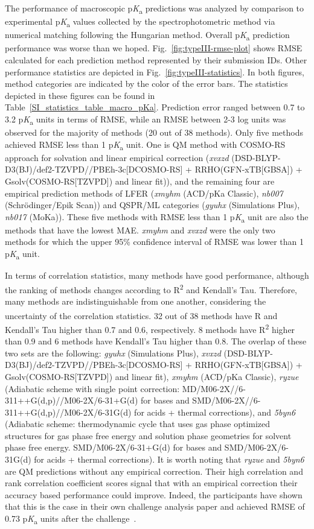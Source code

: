 \documentclass[9pt,lineno,final]{elife}
\newcommand{\pKa}{p\textit{K}\textsubscript{a}}
\begin{document}
The performance of macroscopic \pKa{} predictions was analyzed by comparison to experimental \pKa{} values collected by the spectrophotometric method via numerical matching following the Hungarian method.  
Overall \pKa{} prediction performance was worse than we hoped. 
Fig.~\ref{fig:typeIII-rmse-plot} shows RMSE calculated for each prediction method represented by their submission IDs. 
Other performance statistics are depicted in Fig.~\ref{fig:typeIII-statistics}.
In both figures, method categories are indicated by the color of the error bars. The statistics depicted in these figures can be found in Table~\ref{SI_statistics_table_macro_pKa}.
Prediction error ranged between 0.7 to 3.2 \pKa{} units in terms of RMSE, while an RMSE between 2-3 log units was observed for the majority of methods (20 out of 38 methods). 
Only five methods achieved RMSE less than 1 \pKa{} unit. 
One is QM method with COSMO-RS approach for solvation and linear empirical correction (\textit{xvxzd} (DSD-BLYP-D3(BJ)/def2-TZVPD//PBEh-3c[DCOSMO-RS] + RRHO(GFN-xTB[GBSA]) + Gsolv(COSMO-RS[TZVPD]) and linear fit)), and the remaining four are empirical prediction methods of LFER (\textit{xmyhm} (ACD/pKa Classic), \textit{nb007} (Schr\"{o}dinger/Epik Scan)) and QSPR/ML categories (\textit{gyuhx} (Simulations Plus), \textit{nb017} (MoKa)). 
These five methods with RMSE less than 1 \pKa{} unit are also the methods that have the lowest MAE.
\textit{xmyhm} and \textit{xvxzd} were the only two methods for which the upper 95\% confidence interval of RMSE was lower than 1 \pKa{} unit. 

In terms of correlation statistics, many methods have good performance, although the ranking of methods changes according to R\textsuperscript{2} and Kendall's Tau. 
Therefore, many methods are indistinguishable from one another, considering the uncertainty of the correlation statistics. 
32 out of 38 methods have R\textsuperscript{} and Kendall's Tau higher than 0.7 and 0.6, respectively.
8 methods have R\textsuperscript{2} higher than 0.9 and 6 methods have Kendall's Tau higher than 0.8.
The overlap of these two sets are the following:
\textit{gyuhx} (Simulations Plus), \textit{xvxzd} (DSD-BLYP-D3(BJ)/def2-TZVPD//PBEh-3c[DCOSMO-RS] + RRHO(GFN-xTB[GBSA]) + Gsolv(COSMO-RS[TZVPD]) and linear fit), \textit{xmyhm} (ACD/pKa Classic), \textit{ryzue} (Adiabatic scheme with single point correction: MD/M06-2X//6-311++G(d,p)//M06-2X/6-31+G(d) for bases and SMD/M06-2X//6-311++G(d,p)//M06-2X/6-31G(d) for acids + thermal corrections), and \textit{5byn6} 
(Adiabatic scheme: thermodynamic cycle that uses gas phase optimized structures for gas phase free energy and solution phase geometries for solvent phase free energy. 
SMD/M06-2X/6-31+G(d) for bases and SMD/M06-2X/6-31G(d) for acids + thermal corrections).
It is worth noting that \textit{ryzue} and \textit{5byn6} are QM predictions without any empirical correction. Their high correlation and rank correlation coefficient scores signal that with an empirical correction their accuracy based performance could improve. 
Indeed, the participants have shown that this is the case in their own challenge analysis paper and achieved RMSE of 0.73 \pKa{} units after the challenge~\citep{Zeng:2018:J.Comput.AidedMol.Des.}. 
\end{document}
